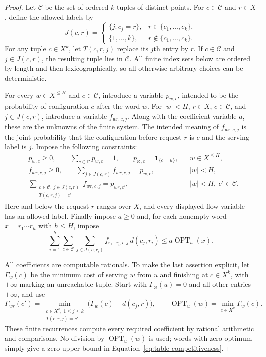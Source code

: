 \begin{proof}
Let $\mathcal C$ be the set of ordered $k$-tuples of distinct points.
For $c\in\mathcal C$ and $r\in X$, define the allowed labels by
\[
 J(c,r)=
 \begin{cases}
  \{j:c_j=r\},&r\in\{c_1,\ldots,c_k\},\\
  \{1,\ldots,k\},&r\notin\{c_1,\ldots,c_k\}.
 \end{cases}
\]
For any tuple $c\in X^k$, let $T(c,r,j)$ replace its $j$th entry by
$r$. If $c\in\mathcal C$ and $j\in J(c,r)$, the resulting tuple lies
in $\mathcal C$. All finite index sets below are ordered by length and
then lexicographically, so all otherwise arbitrary choices can be
deterministic.

For every $w\in X^{\le H}$ and $c\in\mathcal C$, introduce a
variable $p_{w,c}$, intended to be the probability of configuration $c$
after the word $w$. For $|w|<H$, $r\in X$, $c\in\mathcal C$, and
$j\in J(c,r)$, introduce a variable $f_{wr,c,j}$. Along with the
coefficient variable $a$, these are the unknowns of the finite system.
The intended meaning of $f_{wr,c,j}$ is the joint probability that the
configuration before request $r$ is $c$ and the serving label is $j$.
Impose the following constraints:
\begin{align}
 &p_{w,c}\ge0,\qquad \sum_{c\in\mathcal C}p_{w,c}=1,
 \qquad p_{\varnothing,c}=\mathbf1_{\{c=u\}},
 && w\in X^{\le H},                                      \label{eq:table-masses}\\
 &f_{wr,c,j}\ge0,\qquad
 \sum_{j\in J(c,r)}f_{wr,c,j}=p_{w,c},
 && |w|<H,                                               \label{eq:table-outflow}\\
 &\sum_{\substack{c\in\mathcal C,\ j\in J(c,r)\\
                   T(c,r,j)=c'}} f_{wr,c,j}=p_{wr,c'},
 && |w|<H,\ c'\in\mathcal C.                             \label{eq:table-inflow}
\end{align}
Here and below the request $r$ ranges over $X$, and every displayed
flow variable has an allowed label. Finally impose $a\ge0$ and, for
each nonempty word $x=r_1\cdots r_h$ with $h\le H$, impose
\begin{equation}\label{eq:table-competitiveness}
 \sum_{i=1}^h\sum_{c\in\mathcal C}\sum_{j\in J(c,r_i)}
     f_{r_1\cdots r_i,c,j}\,d(c_j,r_i)
 \le a\operatorname{OPT}_u(x).
\end{equation}

All coefficients are computable rationals. To make the last assertion
explicit, let $\Gamma_w(c)$ be the minimum cost of serving $w$ from
$u$ and finishing at $c\in X^k$, with $+\infty$ marking an unreachable
tuple. Start with $\Gamma_{\varnothing}(u)=0$ and all other entries
$+\infty$, and use
\[
 \Gamma_{wr}(c')=
 \min_{\substack{c\in X^k,\ 1\le j\le k\\T(c,r,j)=c'}}
        \bigl(\Gamma_w(c)+d(c_j,r)\bigr),
 \qquad
 \operatorname{OPT}_u(w)=\min_{c\in X^k}\Gamma_w(c).
\]
These finite recurrences compute every required coefficient by rational
arithmetic and comparisons. No division by $\operatorname{OPT}_u(w)$
is used; words with zero optimum simply give a zero upper bound in
Equation~\eqref{eq:table-competitiveness}.


\end{proof}
